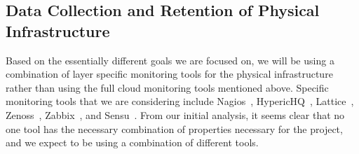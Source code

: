 \subsection{Data Collection and Retention of Physical Infrastructure}



Based on the essentially different goals we are focused on, we will be using a combination of layer specific monitoring tools for the physical infrastructure rather than using the full cloud monitoring tools mentioned above. Specific monitoring tools that we are considering include Nagios~\cite{nagios,nagiosdoc}, HypericHQ~\cite{hyperichq}, Lattice~\cite{clayman2010monitoring}, Zenoss~\cite{zenoss}, Zabbix~\cite{zabbix}, and Sensu~\cite{sandoval2012evaluation,Aceto2013}. From our initial analysis, it seems clear that no one tool has the necessary combination of properties necessary for the project, and we expect to be using a combination of different tools.